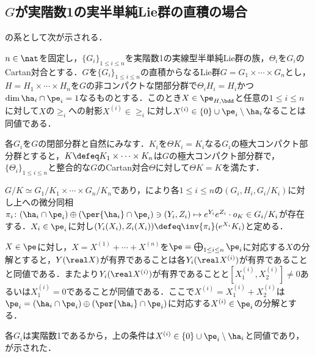 \subsection{$G$が実階数1の実半単純Lie群の直積の場合}
の系として次が示される．
\begin{cor}\label{cor:0113-main}
  $n\in \nat$を固定し，$\{G_i \}_{1\leq i\leq n} $を実階数1の実線型半単純Lie群の族，$\Theta_i $を$G_i$のCartan対合とする．$G$を$\{G_i \}_{1\leq i\leq n} $の直積からなるLie群$G = G_1\times \cdots \times G_n $とし，$H = H_1\times \cdots \times H_n $を$G$の非コンパクトな閉部分群で$\Theta_i H_i = H_i$かつ$\dim \ha_i \cap\pe_i = 1$なるものとする．このとき$X\in \pe_{H,\bdd} $と任意の$1\leq i\leq n$に対して$X$の$\ge_i$への射影$X^{(i)}\in \ge_{i}$に対し$X^{(i)} \in \{0\}\cup\pe_i\setminus\ha_i $なることは同値である．
\end{cor}


  
\begin{npfwn}  
  各$G_i $を$G$の閉部分群と自然にみなす．$K_i$を$\Theta K_i = K_i $なる$G_i$の極大コンパクト部分群とすると，$K \defeq K_1\times \cdots \times K_n $は$G$の極大コンパクト部分群で，$\{\Theta_i\}_{1\leq i\leq n} $と整合的な$G$のCartan対合$\Theta$に対して$\Theta K = K $を満たす．

  $G/K\simeq G_1/K_1\times \cdots \times G_n/K_n $であり，により各$1\leq i\leq n$の$(G_i, H_i, G_i/K_i) $に対し上への微分同相$\pi_i\colon  (\ha_i\cap\pe_i)\oplus (\per{\ha_i}\cap \pe_i) \ni (Y_i, Z_i)\mapsto e^{Y_i}e^{Z_i}\cdot o_K \in G_i/K_i $が存在する．$X_i\in \pe_i $に対し$(Y_i(X_i), Z_i(X_i))\defeq \inv{\pi_i}(e^{X_i}K_i) $と定める．

  $X\in \pe$に対し，$X = X^{(1)} +\cdots + X^{(n)} $を$\pe = \bigoplus_{1\leq i\leq n}\pe_i $に対応する$X$の分解とすると，$Y(\real X) $が有界であることは各$Y_i(\real X^{(i)}) $が有界であることと同値である．またより$Y_i(\real X^{(i)}) $が有界であることと$[X_1^{(i)}, X_2^{(i)} ] \neq 0 $あるいは$X^{(i)}_1 = 0 $であることが同値である．ここで$X^{(i)} =  X_1^{(i)} + X_2^{(i)}$は$\pe_i = (\ha_i\cap\pe_i)\oplus (\per{\ha_i}\cap\pe_i) $に対応する$X^{(i)}\in \pe_i $の分解とする．

  各$G_i$は実階数1であるから，上の条件は$X^{(i)}\in \{0\}\cup\pe_i\setminus\ha_i $と同値であり，が示された．
\end{npfwn}


